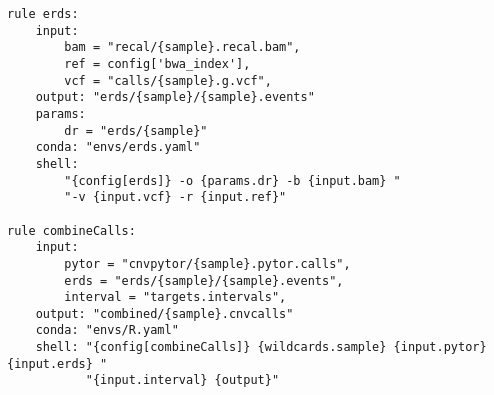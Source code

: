\documentclass{article}\usepackage[]{graphicx}\usepackage[]{color}
\makeatletter
\newenvironment{kframe}{%
 \def\at@end@of@kframe{}%
 \ifinner\ifhmode%
  \def\at@end@of@kframe{\end{minipage}}%
  \begin{minipage}{\columnwidth}%
 \fi\fi%
 \def\FrameCommand##1{\hskip\@totalleftmargin \hskip-\fboxsep
 \colorbox{shadecolor}{##1}\hskip-\fboxsep
     \hskip-\linewidth \hskip-\@totalleftmargin \hskip\columnwidth}%
 \MakeFramed {\advance\hsize-\width
   \@totalleftmargin\z@ \linewidth\hsize
   \@setminipage}}%
 {\par\unskip\endMakeFramed%
 \at@end@of@kframe}
\newenvironment{knitrout}{}{} %
\makeatother
\begin{document}
\begin{knitrout}
\begin{kframe}
\begin{verbatim}
rule erds:
    input:
        bam = "recal/{sample}.recal.bam",
        ref = config['bwa_index'],
        vcf = "calls/{sample}.g.vcf",
    output: "erds/{sample}/{sample}.events"
    params:
        dr = "erds/{sample}"
    conda: "envs/erds.yaml"
    shell:
        "{config[erds]} -o {params.dr} -b {input.bam} "
        "-v {input.vcf} -r {input.ref}"

rule combineCalls:
    input: 
        pytor = "cnvpytor/{sample}.pytor.calls", 
        erds = "erds/{sample}/{sample}.events",
        interval = "targets.intervals",
    output: "combined/{sample}.cnvcalls"
    conda: "envs/R.yaml"
    shell: "{config[combineCalls]} {wildcards.sample} {input.pytor} {input.erds} "
           "{input.interval} {output}"
\end{verbatim}
\end{kframe}
\end{knitrout}
\end{document}
